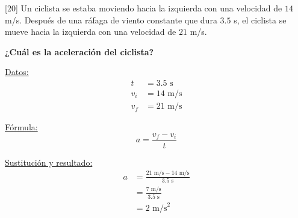 [20] Un ciclista se estaba moviendo hacia la izquierda con una velocidad de $14$ m/s. Después de una ráfaga
de viento constante que dura $3.5$ s, el ciclista se mueve hacia la izquierda con una velocidad de $21$ m/s.

\textbf{¿Cuál es la aceleración del ciclista?}

\begin{minipage}[c]{\linewidth}
    \begin{solutionbox}{4.5cm}
        \begin{minipage}[t]{0.3\textwidth}
            \centering
            \underline{Datos:}
            \begin{align*}
                t   & =  3.5 \text{ s}  \\
                v_i & = 14  \text{ m/s} \\
                v_f & = 21  \text{ m/s}
            \end{align*}
        \end{minipage}%
        \begin{minipage}[t]{0.3\textwidth}
            \centering
            \underline{F\'ormula:}
            \begin{equation*}
                a=\frac{v_f-v_i}{t}
            \end{equation*}
        \end{minipage}
        \begin{minipage}[t]{0.3\textwidth}
            \centering
            \underline{Sustituci\'on y resultado:}
            \begin{align*}
                a & =\frac{21 \text{ m/s}-14 \text{ m/s}}{3.5 \text{ s}} \\
                  & = \frac{7 \text{ m/s}}{3.5 \text{ s}}                \\
                  & =2 \text{ m/s}^2
            \end{align*}
        \end{minipage}
    \end{solutionbox}
\end{minipage}